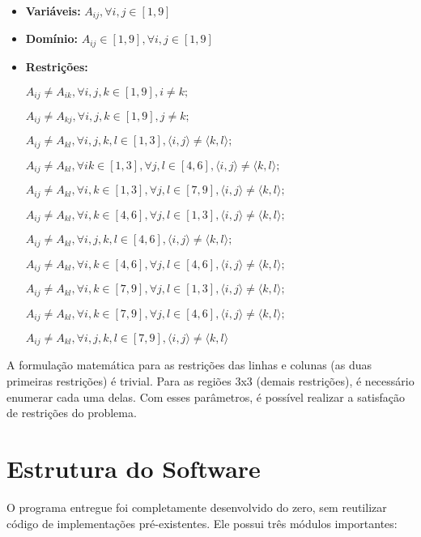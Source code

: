\documentclass[journal,transmag]{IEEEtran}
\begin{document}
\begin{itemize}
\item \textbf{Variáveis:}
$A_{ij}, \forall i, j \in [1, 9] $
\item \textbf{Domínio:}
$A_{ij} \in [1, 9], \forall i, j \in [1, 9]$
\item \textbf{Restrições:}

$A_{ij} \neq A_{ik}, \forall i, j, k \in [1, 9], i \neq k;$

$A_{ij} \neq A_{kj}, \forall i, j, k \in [1, 9], j \neq k;$

$A_{ij} \neq A_{kl}, \forall i, j, k, l \in [1, 3], \langle i, j \rangle \neq \langle k, l \rangle;$

$A_{ij} \neq A_{kl}, \forall i k \in [1, 3], \forall j, l \in [4, 6], \langle i, j \rangle \neq \langle k, l \rangle;$

$A_{ij} \neq A_{kl}, \forall i, k \in [1, 3], \forall j, l \in [7, 9], \langle i, j \rangle \neq \langle k, l \rangle;$

$A_{ij} \neq A_{kl}, \forall i, k \in [4, 6], \forall j, l \in [1, 3], \langle i, j \rangle \neq \langle k, l \rangle;$

$A_{ij} \neq A_{kl}, \forall i, j, k, l \in [4, 6], \langle i, j \rangle \neq \langle k, l \rangle;$

$A_{ij} \neq A_{kl}, \forall i, k \in [4, 6], \forall j, l \in [4, 6], \langle i, j \rangle \neq \langle k, l \rangle;$

$A_{ij} \neq A_{kl}, \forall i, k \in [7, 9], \forall j, l \in [1, 3], \langle i, j \rangle \neq \langle k, l \rangle;$

$A_{ij} \neq A_{kl}, \forall i, k \in [7, 9], \forall j, l \in [4, 6], \langle i, j \rangle \neq \langle k, l \rangle;$

$A_{ij} \neq A_{kl}, \forall i, j, k, l \in [7, 9], \langle i, j \rangle \neq \langle k, l \rangle$
\end{itemize}

A formulação matemática para as restrições das linhas e colunas (as duas
primeiras restrições) é trivial. Para as regiões 3x3 (demais restrições), é
necessário enumerar cada uma delas. Com esses parâmetros, é possível realizar a
satisfação de restrições do problema.

\section{Estrutura do Software}
O programa entregue foi completamente desenvolvido do zero, sem reutilizar
código de implementações pré-existentes. Ele possui três módulos importantes:
\end{document}

